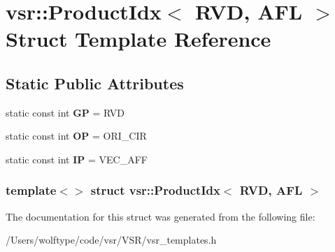 \hypertarget{structvsr_1_1_product_idx_3_01_r_v_d_00_01_a_f_l_01_4}{\section{vsr\-:\-:Product\-Idx$<$ R\-V\-D, A\-F\-L $>$ Struct Template Reference}
\label{structvsr_1_1_product_idx_3_01_r_v_d_00_01_a_f_l_01_4}
}
\subsection*{Static Public Attributes}
\begin{DoxyCompactItemize}
\item 
\hypertarget{structvsr_1_1_product_idx_3_01_r_v_d_00_01_a_f_l_01_4_a7a8017580e9c4e07ac70d5020142699f}{static const int {\bfseries G\-P} = R\-V\-D}\label{structvsr_1_1_product_idx_3_01_r_v_d_00_01_a_f_l_01_4_a7a8017580e9c4e07ac70d5020142699f}

\item 
\hypertarget{structvsr_1_1_product_idx_3_01_r_v_d_00_01_a_f_l_01_4_a06a5de677e6e38cc69a043f3272d66fc}{static const int {\bfseries O\-P} = O\-R\-I\-\_\-\-C\-I\-R}\label{structvsr_1_1_product_idx_3_01_r_v_d_00_01_a_f_l_01_4_a06a5de677e6e38cc69a043f3272d66fc}

\item 
\hypertarget{structvsr_1_1_product_idx_3_01_r_v_d_00_01_a_f_l_01_4_a12153e78072f2e2a5a3cbd3de57612ec}{static const int {\bfseries I\-P} = V\-E\-C\-\_\-\-A\-F\-F}\label{structvsr_1_1_product_idx_3_01_r_v_d_00_01_a_f_l_01_4_a12153e78072f2e2a5a3cbd3de57612ec}

\end{DoxyCompactItemize}
\subsubsection*{template$<$$>$ struct vsr\-::\-Product\-Idx$<$ R\-V\-D, A\-F\-L $>$}



The documentation for this struct was generated from the following file\-:\begin{DoxyCompactItemize}
\item 
/\-Users/wolftype/code/vsr/\-V\-S\-R/vsr\-\_\-templates.\-h\end{DoxyCompactItemize}
